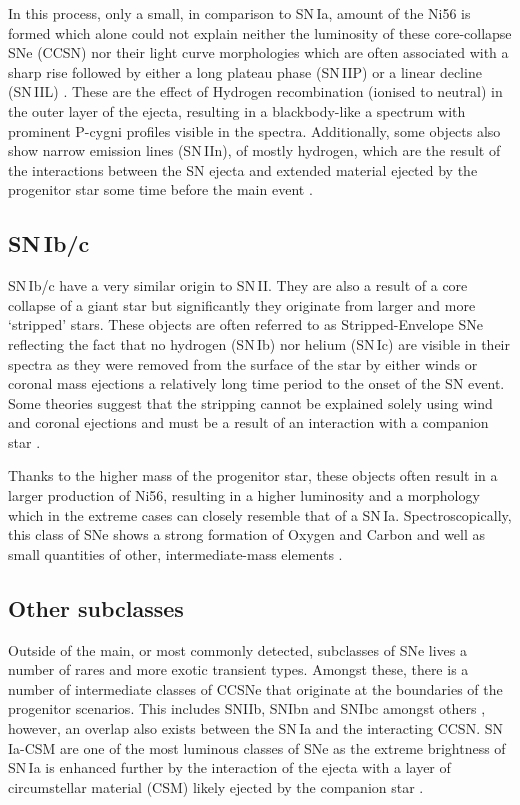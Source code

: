 In this process, only a small, in comparison to SN\,Ia, amount of the Ni56 is formed which alone could not explain neither the luminosity of these core-collapse SNe (CCSN) nor their light curve morphologies which are often associated with a sharp rise followed by either a long plateau phase (SN\,IIP) or a linear decline (SN\,IIL) \citep{Alsabti2017}. These are the effect of Hydrogen recombination (ionised to neutral) in the outer layer of the ejecta, resulting in a blackbody-like a spectrum with prominent P-cygni profiles visible in the spectra. Additionally, some objects also show narrow emission lines (SN\,IIn), of mostly hydrogen, which are the result of the interactions between the SN ejecta and extended material ejected by the progenitor star some time before the main event \citep{Pastorello2002,Sternberg2011}.

\subsection{SN\,Ib/c}
SN\,Ib/c have a very similar origin to SN\,II. They are also a result of a core collapse of a giant star but significantly they originate from larger and more `stripped' stars. These objects are often referred to as Stripped-Envelope SNe reflecting the fact that no hydrogen (SN\,Ib) nor helium (SN\,Ic) are visible in their spectra as they were removed from the surface of the star by either winds or coronal mass ejections a relatively long time period to the onset of the SN event. Some theories suggest that the stripping cannot be explained solely using wind and coronal ejections and must be a result of an interaction with a companion star \citep{Tauris2013}.

Thanks to the higher mass of the progenitor star, these objects often result in a larger production of Ni56, resulting in a higher luminosity and a morphology which in the extreme cases can closely resemble that of a SN\,Ia. Spectroscopically, this class of SNe shows a strong formation of Oxygen and Carbon and well as small quantities of other, intermediate-mass elements \citep{Filippenko1997}.

\subsection{Other subclasses}
Outside of the main, or most commonly detected, subclasses of SNe lives a number of rares and more exotic transient types. Amongst these, there is a number of intermediate classes of CCSNe that originate at the boundaries of the progenitor scenarios. This includes SNIIb, SNIbn and SNIbc amongst others \citep{Alsabti2017}, however, an overlap also exists between the SN\,Ia and the interacting CCSN. SN\,Ia-CSM are one of the most luminous classes of SNe as the extreme brightness of SN\,Ia is enhanced further by the interaction of the ejecta with a layer of circumstellar material (CSM) likely ejected by the companion star \citep{Dilday2012}.

